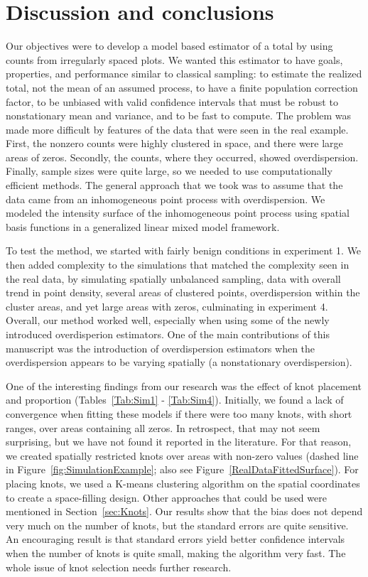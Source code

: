 \documentclass[12pt, titlepage]{article}\usepackage[]{graphicx}\usepackage[]{color}
\begin{document}
\section{Discussion and conclusions} \label{sec:DiscConc}

Our objectives were to develop a model based estimator of a total by using counts from irregularly spaced plots.  We wanted this estimator to have goals, properties, and performance similar to classical sampling: to estimate the realized total, not the mean of an assumed process, to have a finite population correction factor, to be unbiased with valid confidence intervals that must be robust to nonstationary mean and variance, and to be fast to compute. The problem was made more difficult by features of the data that were seen in the real example.  First, the nonzero counts were highly clustered in space, and there were large areas of zeros.   Secondly, the counts, where they occurred, showed overdispersion.  Finally, sample sizes were quite large, so we needed to use computationally efficient methods.  The general approach that we took was to assume that the data came from an inhomogeneous point process with overdispersion. We modeled the intensity surface of the inhomogeneous point process using spatial basis functions in a generalized linear mixed model framework.  

To test the method, we started with fairly benign conditions in experiment 1.  We then added complexity to the simulations that matched the complexity seen in the real data, by simulating spatially unbalanced sampling, data with overall trend in point density, several areas of clustered points, overdispersion within the cluster areas, and yet large areas with zeros, culminating in experiment 4.  Overall, our method worked well, especially when using some of the newly introduced overdisperion estimators. One of the main contributions of this manuscript was the introduction of overdispersion estimators when the overdispersion appears to be varying spatially (a nonstationary overdispersion).  

One of the interesting findings from our research was the effect of knot placement and proportion (Tables~\ref{Tab:Sim1} - \ref{Tab:Sim4}). Initially, we found a lack of convergence when fitting these models if there were too many knots, with short ranges, over areas containing all zeros. In retrospect, that may not seem surprising, but we have not found it reported in the literature.  For that reason, we created spatially restricted knots over areas with non-zero values (dashed line in Figure~\ref{fig:SimulationExample}; also see Figure~\ref{RealDataFittedSurface}). For placing knots, we used a K-means clustering algorithm on the spatial coordinates to create a space-filling design. Other approaches that could be used were mentioned in Section~\ref{sec:Knots}. Our results show that the bias does not depend very much on the number of knots, but the standard errors are quite sensitive.  An encouraging result is that standard errors yield better confidence intervals when the number of knots is quite small, making the algorithm very fast. The whole issue of knot selection needs further research.
\end{document}
